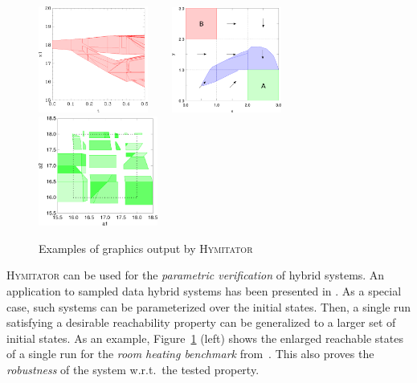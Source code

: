 \documentclass{llncs}
\newcommand{\hymitator}{\textsc{Hymitator}}
\newcommand{\commentaire}[1]{\textcolor{red}{\textbf{$\Leftarrow$  #1 $\Rightarrow$}}}
\begin{document}
\begin{figure}[ht!]
	\centering
		\includegraphics[width=3.6cm]{plot_t_x1} \ \ \ 
		\includegraphics[width=3.6cm]{navigation_map.pdf} \ \ \ 
		\includegraphics[height=3.6cm]{rhb_cart2.pdf}
	\caption{Examples of graphics output by \hymitator{}}
	\label{fig:plot_rhb}
\end{figure}


\hymitator{} can be used for the \emph{parametric verification} of hybrid systems. An application to sampled data hybrid systems has been presented in \cite{FK11}. As a special case, such systems can be parameterized over the initial states. Then, a single run satisfying a desirable reachability property can be generalized to a larger set of initial states. As an example, Figure~\ref{fig:plot_rhb} (left) shows the enlarged reachable states of a single run for the \emph{room heating benchmark} from~\cite{FI2004}.
This also proves the \emph{robustness} of the system w.r.t.~the tested property.
\end{document}
